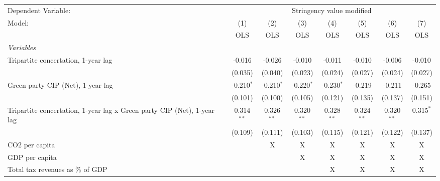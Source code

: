 
\begingroup
\centering
\begin{tabular}{lccccccc}
   \toprule
   Dependent Variable: & \multicolumn{7}{c}{Stringency value modified}\\
   Model:                                                                  & (1)          & (2)          & (3)          & (4)          & (5)          & (6)          & (7)\\  
                                                                           &  OLS         & OLS          & OLS          & OLS          & OLS          & OLS          & OLS\\  
   \midrule
   \emph{Variables}\\
   Tripartite concertation, 1-year lag                                     & -0.016       & -0.026       & -0.010       & -0.011       & -0.010       & -0.006       & -0.010\\   
                                                                           & (0.035)      & (0.040)      & (0.023)      & (0.024)      & (0.027)      & (0.024)      & (0.027)\\   
   Green party CIP (Net), 1-year lag                                       & -0.210$^{*}$ & -0.210$^{*}$ & -0.220$^{*}$ & -0.230$^{*}$ & -0.219       & -0.211       & -0.265\\   
                                                                           & (0.101)      & (0.100)      & (0.105)      & (0.121)      & (0.135)      & (0.137)      & (0.151)\\   
   Tripartite concertation, 1-year lag x Green party CIP (Net), 1-year lag & 0.314$^{**}$ & 0.326$^{**}$ & 0.320$^{**}$ & 0.328$^{**}$ & 0.324$^{**}$ & 0.320$^{**}$ & 0.315$^{*}$\\   
                                                                           & (0.109)      & (0.111)      & (0.103)      & (0.115)      & (0.121)      & (0.122)      & (0.137)\\   
   CO2 per capita                                                          &              & X            & X            & X            & X            & X            & X\\  
   GDP per capita                                                          &              &              & X            & X            & X            & X            & X\\  
   Total tax revenues as \% of GDP                                         &              &              &              & X            & X            & X            & X\\  

\end{tabular}
